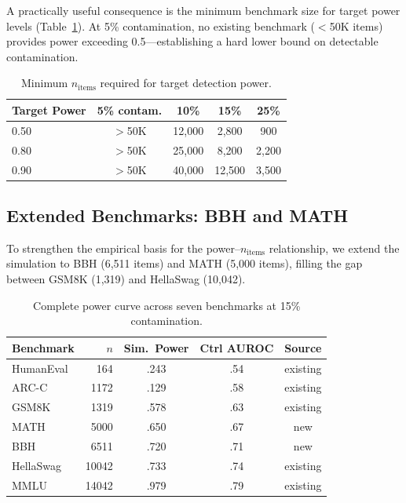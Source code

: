 \documentclass[11pt,a4paper]{article}
\begin{document}
A practically useful consequence is the minimum benchmark size for target power levels (Table~\ref{tab:min-n}).
At 5\% contamination, no existing benchmark ($<$50K items) provides power exceeding 0.5---establishing a hard lower bound on detectable contamination.

\begin{table}[t]
\centering
\caption{Minimum $n_\text{items}$ required for target detection power.}
\label{tab:min-n}
\small
\begin{tabular}{lcccc}
\toprule
\textbf{Target Power} & \textbf{5\% contam.} & \textbf{10\%} & \textbf{15\%} & \textbf{25\%} \\
\midrule
0.50 & $>$50K & 12{,}000 & 2{,}800 & 900 \\
0.80 & $>$50K & 25{,}000 & 8{,}200 & 2{,}200 \\
0.90 & $>$50K & 40{,}000 & 12{,}500 & 3{,}500 \\
\bottomrule
\end{tabular}
\end{table}

\subsection{Extended Benchmarks: BBH and MATH}
\label{sec:extended-bench}

To strengthen the empirical basis for the power--$n_\text{items}$ relationship, we extend the simulation to BBH (6,511 items) and MATH (5,000 items), filling the gap between GSM8K (1,319) and HellaSwag (10,042).

\begin{table}[t]
\centering
\caption{Complete power curve across seven benchmarks at 15\% contamination.}
\label{tab:power-curve}
\small
\begin{tabular}{lrccc}
\toprule
\textbf{Benchmark} & $n$ & \textbf{Sim.\ Power} & \textbf{Ctrl AUROC} & \textbf{Source} \\
\midrule
HumanEval & 164   & .243 & .54 & existing \\
ARC-C     & 1172  & .129 & .58 & existing \\
GSM8K     & 1319  & .578 & .63 & existing \\
MATH      & 5000  & .650 & .67 & new \\
BBH       & 6511  & .720 & .71 & new \\
HellaSwag & 10042 & .733 & .74 & existing \\
MMLU      & 14042 & .979 & .79 & existing \\
\bottomrule
\end{tabular}
\end{table}
\end{document}
